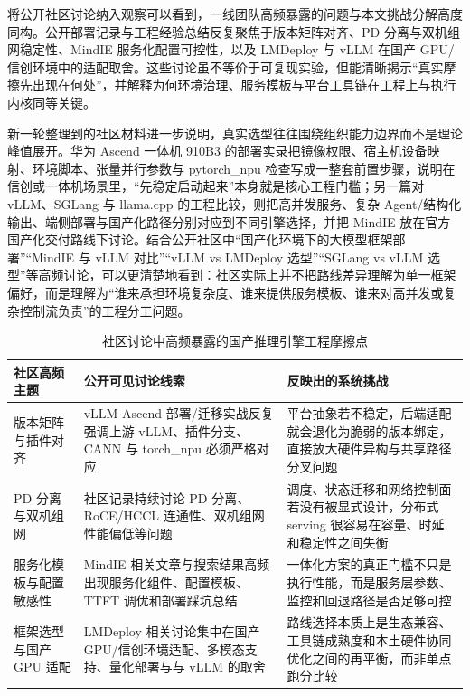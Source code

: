 将公开社区讨论纳入观察可以看到，一线团队高频暴露的问题与本文挑战分解高度同构。公开部署记录与工程经验总结反复聚焦于版本矩阵对齐、PD 分离与双机组网稳定性、MindIE 服务化配置可控性，以及 LMDeploy 与 vLLM 在国产 GPU/信创环境中的适配取舍\citep{zhihu_vllm_ascend_guide,zhihu_vllm_pd_migration,zhihu_mindie_deploy,zhihu_lmdeploy_domestic}。这些讨论虽不等价于可复现实验，但能清晰揭示“真实摩擦先出现在何处”，并解释为何环境治理、服务模板与平台工具链在工程上与执行内核同等关键。

新一轮整理到的社区材料进一步说明，真实选型往往围绕组织能力边界而不是理论峰值展开。华为 Ascend 一体机 910B3 的部署实录把镜像权限、宿主机设备映射、环境脚本、张量并行参数与 pytorch\_npu 检查写成一整套前置步骤，说明在信创或一体机场景里，“先稳定启动起来”本身就是核心工程门槛\citep{zhihu_ascend_appliance_mindie_vllm}；另一篇对 vLLM、SGLang 与 llama.cpp 的工程比较，则把高并发服务、复杂 Agent/结构化输出、端侧部署与国产化路径分别对应到不同引擎选择，并把 MindIE 放在官方国产化交付路线下讨论\citep{zhihu_vllm_sglang_llamacpp_compare}。结合公开社区中“国产化环境下的大模型框架部署”“MindIE 与 vLLM 对比”“vLLM vs LMDeploy 选型”“SGLang vs vLLM 选型”等高频讨论，可以更清楚地看到：社区实际上并不把路线差异理解为单一框架偏好，而是理解为“谁来承担环境复杂度、谁来提供服务模板、谁来对高并发或复杂控制流负责”的工程分工问题。

\begin{table}[t]
\centering
\footnotesize
\setlength{\tabcolsep}{4pt}
\caption{社区讨论中高频暴露的国产推理引擎工程摩擦点}
\label{tab:community-frictions}
\begin{tabularx}{\textwidth}{>{\raggedright\arraybackslash}p{3.0cm}p{5.2cm}X}
\toprule
社区高频主题 & 公开可见讨论线索 & 反映出的系统挑战 \\
\midrule
版本矩阵与插件对齐 & vLLM-Ascend 部署/迁移实战反复强调上游 vLLM、插件分支、CANN 与 torch\_npu 必须严格对应\citep{zhihu_vllm_ascend_guide,zhihu_vllm_pd_migration} & 平台抽象若不稳定，后端适配就会退化为脆弱的版本绑定，直接放大硬件异构与共享路径分叉问题 \\
PD 分离与双机组网 & 社区记录持续讨论 PD 分离、RoCE/HCCL 连通性、双机组网性能偏低等问题\citep{zhihu_vllm_pd_migration,xhs_search_vllm_ascend,xhs_search_mindie} & 调度、状态迁移和网络控制面若没有被显式设计，分布式 serving 很容易在容量、时延和稳定性之间失衡 \\
服务化模板与配置敏感性 & MindIE 相关文章与搜索结果高频出现服务化组件、配置模板、TTFT 调优和部署踩坑总结\citep{zhihu_mindie_deploy,xhs_search_mindie} & 一体化方案的真正门槛不只是执行性能，而是服务层参数、监控和回退路径是否足够可控 \\
框架选型与国产 GPU 适配 & LMDeploy 相关讨论集中在国产 GPU/信创环境适配、多模态支持、量化部署与与 vLLM 的取舍\citep{zhihu_lmdeploy_domestic,xhs_search_lmdeploy} & 路线选择本质上是生态兼容、工具链成熟度和本土硬件协同优化之间的再平衡，而非单点跑分比较 \\
\bottomrule
\end{tabularx}
\end{table}

